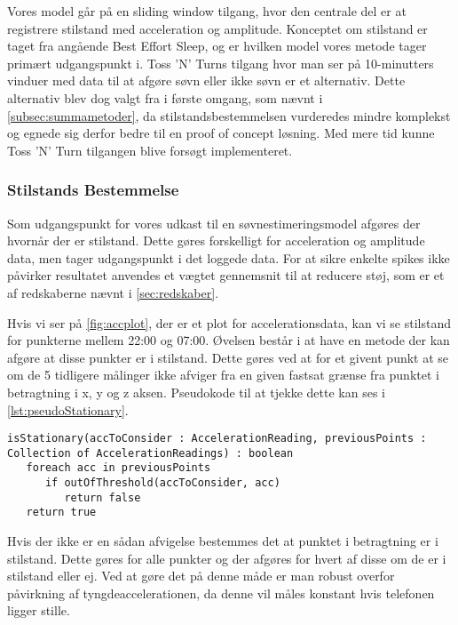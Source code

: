 Vores model går på en sliding window tilgang, hvor den centrale del er at registrere stilstand med acceleration og amplitude.
Konceptet om stilstand er taget fra \citet{6563918} angående Best Effort Sleep, og er hvilken model vores metode tager primært udgangspunkt i.
Toss 'N' Turns tilgang hvor man ser på 10-minutters vinduer med data til at afgøre søvn eller ikke søvn er et alternativ.
Dette alternativ blev dog valgt fra i første omgang, som nævnt i \cref{subsec:summametoder}, da stilstandsbestemmelsen vurderedes mindre komplekst og egnede sig derfor bedre til en proof of concept løsning.
Med mere tid kunne Toss 'N' Turn tilgangen blive forsøgt implementeret.

\subsubsection{Stilstands Bestemmelse}
Som udgangspunkt for vores udkast til en søvnestimeringsmodel afgøres der hvornår der er stilstand.
Dette gøres forskelligt for acceleration og amplitude data, men tager udgangspunkt i det loggede data.
For at sikre enkelte spikes ikke påvirker resultatet anvendes et vægtet gennemsnit til at reducere støj, som er et af redskaberne nævnt i \cref{sec:redskaber}.

Hvis vi ser på \cref{fig:accplot}, der er et plot for accelerationsdata, kan vi se stilstand for punkterne mellem 22:00 og 07:00.
Øvelsen består i at have en metode der kan afgøre at disse punkter er i stilstand.
Dette gøres ved at for et givent punkt at se om de 5 tidligere målinger ikke afviger fra en given fastsat grænse fra punktet i betragtning i x, y og z aksen.
Pseudokode til at tjekke dette kan ses i \cref{lst:pseudoStationary}.
\begin{lstlisting}[caption={Pseudo kode for at tjekke om et punkt er i stilstand.}, label={lst:pseudoStationary}]
isStationary(accToConsider : AccelerationReading, previousPoints : Collection of AccelerationReadings) : boolean
   foreach acc in previousPoints
      if outOfThreshold(accToConsider, acc)
         return false
   return true
\end{lstlisting}

Hvis der ikke er en sådan afvigelse bestemmes det at punktet i betragtning er i stilstand.
Dette gøres for alle punkter og der afgøres for hvert af disse om de er i stilstand eller ej.
Ved at gøre det på denne måde er man robust overfor påvirkning af tyngdeaccelerationen, da denne vil måles konstant hvis telefonen ligger stille.

